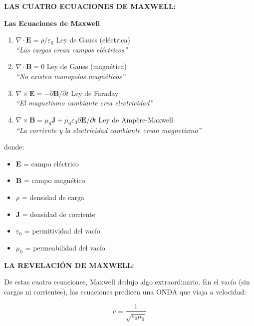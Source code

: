 \textbf{LAS CUATRO ECUACIONES DE MAXWELL:}

\begin{nivelmatematico}
\textbf{Las Ecuaciones de Maxwell}

\begin{enumerate}
    \item $\nabla \cdot \mathbf{E} = \rho/\varepsilon_0$ \hfill Ley de Gauss (eléctrica)\\
    \textit{``Las cargas crean campos eléctricos''}

    \item $\nabla \cdot \mathbf{B} = 0$ \hfill Ley de Gauss (magnética)\\
    \textit{``No existen monopolos magnéticos''}

    \item $\nabla \times \mathbf{E} = -\partial\mathbf{B}/\partial t$ \hfill Ley de Faraday\\
    \textit{``El magnetismo cambiante crea electricidad''}

    \item $\nabla \times \mathbf{B} = \mu_0\mathbf{J} + \mu_0\varepsilon_0\partial\mathbf{E}/\partial t$ \hfill Ley de Ampère-Maxwell\\
    \textit{``La corriente y la electricidad cambiante crean magnetismo''}
\end{enumerate}

donde:
\begin{itemize}
    \item $\mathbf{E}$ = campo eléctrico
    \item $\mathbf{B}$ = campo magnético
    \item $\rho$ = densidad de carga
    \item $\mathbf{J}$ = densidad de corriente
    \item $\varepsilon_0$ = permitividad del vacío
    \item $\mu_0$ = permeabilidad del vacío
\end{itemize}
\end{nivelmatematico}

\textbf{LA REVELACIÓN DE MAXWELL:}

De estas cuatro ecuaciones, Maxwell dedujo algo extraordinario.
En el vacío (sin cargas ni corrientes), las ecuaciones predicen
una ONDA que viaja a velocidad:

\begin{equation}
c = \frac{1}{\sqrt{\varepsilon_0 \mu_0}}
\end{equation}

